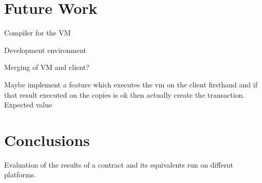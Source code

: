 \section{Future Work}
Compiler for the VM

Development environment

Merging of VM and client?


Maybe implement a feature which executes the vm on the client firsthand and if that result executed on the copies is ok then actually create the transaction. Expected value


\section{Conclusions}
Evaluation of the results of a contract and its equivalents run on differnt platforms.